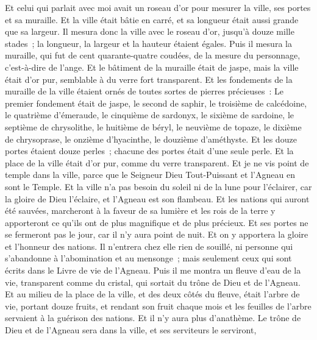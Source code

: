 \begin{multicols}{2}
Et celui qui parlait avec moi avait un roseau d'or pour mesurer la ville, ses portes et sa muraille.
Et la ville était bâtie en carré, et sa longueur était aussi grande que sa largeur. Il mesura donc la ville avec le roseau d'or, jusqu'à douze mille stades~; la longueur, la largeur et la hauteur étaient égales.
Puis il mesura la muraille, qui fut de cent quarante-quatre coudées, de la mesure du personnage, c'est-à-dire de l'ange.
Et le bâtiment de la muraille était de jaspe, mais la ville était d'or pur, semblable à du verre fort transparent.
Et les fondements de la muraille de la ville étaient ornés de toutes sortes de pierres précieuses~: Le premier fondement était de jaspe, le second de saphir, le troisième de calcédoine, le quatrième d'émeraude,
le cinquième de sardonyx, le sixième de sardoine, le septième de chrysolithe, le huitième de béryl, le neuvième de topaze, le dixième de chrysoprase, le onzième d'hyacinthe, le douzième d'améthyste.
Et les douze portes étaient douze perles~; chacune des portes était d'une seule perle. Et la place de la ville était d'or pur, comme du verre transparent.
Et je ne vis point de temple dans la ville, parce que le Seigneur Dieu Tout-Puissant et l'Agneau en sont le Temple.
Et la ville n'a pas besoin du soleil ni de la lune pour l'éclairer, car la gloire de Dieu l'éclaire, et l'Agneau est son flambeau.
Et les nations qui auront été sauvées, marcheront à la faveur de sa lumière et les rois de la terre y apporteront ce qu'ils ont de plus magnifique et de plus précieux.
Et ses portes ne se fermeront pas le jour, car il n'y aura point de nuit.
Et on y apportera la gloire et l'honneur des nations.
Il n'entrera chez elle rien de souillé, ni personne qui s'abandonne à l'abomination et au mensonge~; mais seulement ceux qui sont écrits dans le Livre de vie de l'Agneau.
\VerseOne{}Puis il me montra un fleuve d'eau de la vie, transparent comme du cristal, qui sortait du trône de Dieu et de l'Agneau.
Et au milieu de la place de la ville, et des deux côtés du fleuve, était l'arbre de vie, portant douze fruits, et rendant son fruit chaque mois et les feuilles de l'arbre servaient à la guérison des nations.
Et il n'y aura plus d'anathème. Le trône de Dieu et de l'Agneau sera dans la ville, et ses serviteurs le serviront,

\end{multicols}
